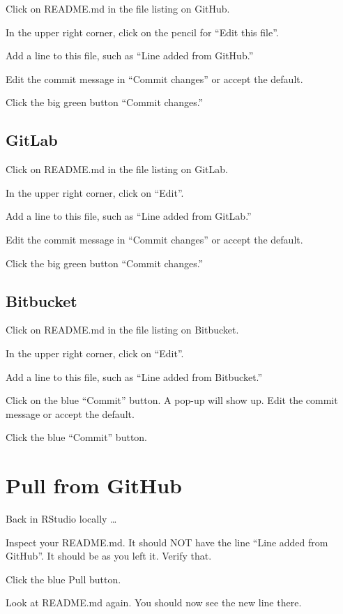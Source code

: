\documentclass[
]{book}
\begin{document}
Click on README.md in the file listing on GitHub.

In the upper right corner, click on the pencil for ``Edit this file''.

Add a line to this file, such as ``Line added from GitHub.''

Edit the commit message in ``Commit changes'' or accept the default.

Click the big green button ``Commit changes.''

\subsection{GitLab}\label{gitlab-1}

Click on README.md in the file listing on GitLab.

In the upper right corner, click on ``Edit''.

Add a line to this file, such as ``Line added from GitLab.''

Edit the commit message in ``Commit changes'' or accept the default.

Click the big green button ``Commit changes.''

\subsection{Bitbucket}\label{bitbucket-1}

Click on README.md in the file listing on Bitbucket.

In the upper right corner, click on ``Edit''.

Add a line to this file, such as ``Line added from Bitbucket.''

Click on the blue ``Commit'' button. A pop-up will show up. Edit the commit message or accept the default.

Click the blue ``Commit'' button.

\section{Pull from GitHub}\label{pull-from-github}

Back in RStudio locally \ldots{}

Inspect your README.md.
It should NOT have the line ``Line added from GitHub''.
It should be as you left it.
Verify that.

Click the blue Pull button.

Look at README.md again.
You should now see the new line there.
\end{document}
